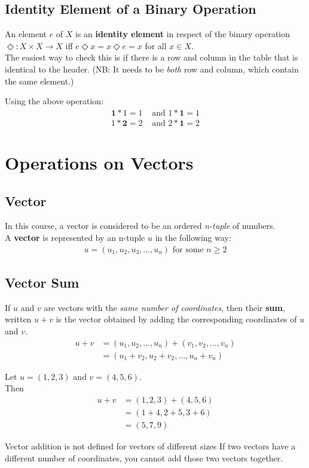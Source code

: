 \documentclass[../notes.tex]{subfiles}
\begin{document}
			\subsection{Identity Element of a Binary Operation}
				An element $e$ of $X$ is an \textbf{identity element} in respect of the binary operation $\Diamond: X \times X \rightarrow X$ iff $e \Diamond x = x \Diamond e = x$ for all $x \in X$.\\
				The easiest way to check this is if there is a row and column in the table that is identical to the header. (NB: It needs to be \textit{both} row and column, which contain the same element.)
				\begin{example}
					Using the above operation:
					\begin{align*}
						\mathbf{1} * 1 = 1 &\text{ and } 1 * \mathbf{1} = 1\\
						1 * \mathbf{2} = 2 &\text{ and } 2 * \mathbf{1} = 2
					\end{align*}
				\end{example}
		\section{Operations on Vectors}
			\subsection{Vector}
				In this course, a vector is considered to be an ordered \textit{n-tuple} of numbers.\\
				A \textbf{vector} is represented by an n-tuple $u$ in the following way:
				\begin{align*}
					u = (u_{1}, u_{2}, u_{3}, \ldots, u_{n}) \text{ for some } n \geq 2
				\end{align*}
			\subsection{Vector Sum}
				If $u$ and $v$ are vectors with the \textit{same number of coordinates}, then their \textbf{sum}, written $u + v$ is the vector obtained by adding the corresponding coordinates of $u$ and $v$.
				\begin{align*}
					u + v &= (u_{1}, u_{2}, \ldots, u_{n}) + (v_{1}, v_{2}, \ldots, v_{n})\\
					&= (u_{1} + v_{2}, u_{2} + v_{2}, \ldots, u_{n} + v_{n})
				\end{align*}
				\begin{example}
					Let $u = (1, 2, 3)$ and $v = (4, 5, 6)$.\\
					Then
					\begin{align*}
						u + v &= (1, 2, 3) + (4, 5, 6)\\
						&= (1 + 4, 2 + 5, 3 + 6)\\
						&= (5, 7, 9)
					\end{align*}
				\end{example}
				\begin{sidenote}{Vector addition is not defined for vectors of different sizes}
					If two vectors have a different number of coordinates, you cannot add those two vectors together.
				\end{sidenote}
			\pagebreak
\end{document}
